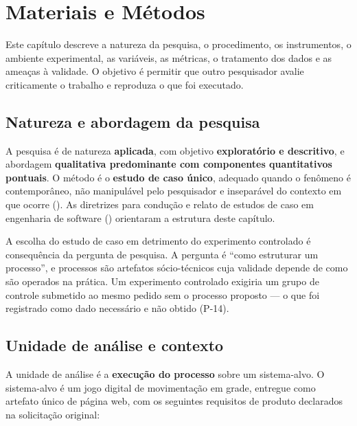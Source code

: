 
\chapter{Materiais e Métodos}
\label{cap:metodos}

Este capítulo descreve a natureza da pesquisa, o procedimento, os instrumentos, o
ambiente experimental, as variáveis, as métricas, o tratamento dos dados e as
ameaças à validade. O objetivo é permitir que outro pesquisador avalie
criticamente o trabalho e reproduza o que foi executado.

\section{Natureza e abordagem da pesquisa}
\label{sec:natureza}

A pesquisa é de natureza \textbf{aplicada}, com objetivo \textbf{exploratório e
descritivo}, e abordagem \textbf{qualitativa predominante com componentes
quantitativos pontuais}. O método é o \textbf{estudo de caso único}, adequado
quando o fenômeno é contemporâneo, não manipulável pelo pesquisador e
inseparável do contexto em que ocorre (). As diretrizes para
condução e relato de estudos de caso em engenharia de software
() orientaram a estrutura deste capítulo.

A escolha do estudo de caso em detrimento do experimento controlado é
consequência da pergunta de pesquisa. A pergunta é ``como estruturar um
processo'', e processos são artefatos sócio-técnicos cuja validade depende de
como são operados na prática. Um experimento controlado exigiria um grupo de
controle submetido ao mesmo pedido sem o processo proposto --- o que foi
registrado como dado necessário e não obtido (P-14).

\section{Unidade de análise e contexto}
\label{sec:unidade}

A unidade de análise é a \textbf{execução do processo} sobre um sistema-alvo. O
sistema-alvo é um jogo digital de movimentação em grade, entregue como artefato
único de página web, com os seguintes requisitos de produto declarados na
solicitação original:

